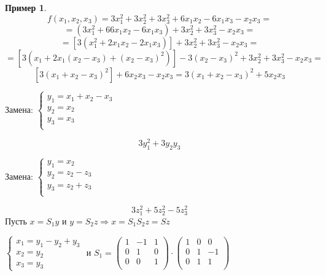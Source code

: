 \documentclass[a4paper, 12pt]{article}
\theoremstyle{definition}
\newtheorem*{example}{Пример}
\begin{document}
\begin{example}

    $$ f(x_1, x_2, x_3) = 3x_1^2 + 3x_2^2 + 3x_3^2 + 6x_1x_2 - 6x_1x_3 - x_2x_3 = $$
    $$ = (3x_1^2 + 66x_1x_2 - 6x_1x_3) + 3x_2^2 + 3x_3^2 - x_2x_3 =  $$
    $$ = [3(x_1^2 + 2x_1x_2 - 2x_1x_3)] + 3x_2^2 + 3x_3^2 - x_2x_3 = $$
    $$ = [3(x_1 + 2x_1(x_2 - x_3) + (x_2 - x_3)^2)] - 3(x_2 - x_3)^2 + 3x_2^2 + 3x_3^2 - x_2x_3 = $$
    $$ [3(x_1 + x_2 - x_3)^2] + 6x_2x_3 - x_2x_3 = 3(x_1 + x_2 - x_3)^2 + 5x_2x_3 $$

    Замена: $ \begin{cases}
            y_1 = x_1 + x_2 - x_3 \\
            y_2 = x_2             \\
            y_3 = x_3             \\
        \end{cases} $

    $$ 3y_1^2 + 3y_2y_3  $$

    Замена: $ \begin{cases}
            y_1 = x_2       \\
            y_2 = z_2 - z_3 \\
            y_3 = z_2 + z_3 \\
        \end{cases} $

    $$ 3z_1^2 + 5z_2^2 - 5z_3^2 $$
    Пусть $x = S_1 y$ и $y = S_2 z \Rightarrow x = S_1 S_2 z = S z$

    $ \begin{cases}
            x_1 = y_1 - y_2 + y_3 \\
            x_2 = y_2             \\
            x_3 = y_3
        \end{cases}$ и $ S_1 = \begin{pmatrix}
            1 & -1 & 1 \\
            0 & 1  & 0 \\
            0 & 0  & 1 \\
        \end{pmatrix} \cdot \begin{pmatrix}
            1 & 0 & 0  \\
            0 & 1 & -1 \\
            0 & 1 & 1  \\
        \end{pmatrix} $
\end{example}
\par
\end{document}
